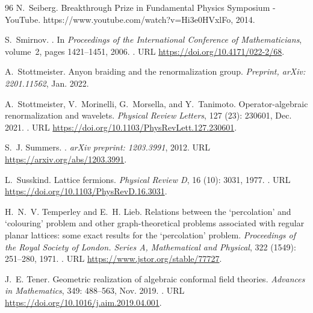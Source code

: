 \documentclass[a4paper, 11pt]{article}
\DeclareMathOperator{\1}{\mathds{1}}
\begin{document}
\begin{thebibliography}{96}
N.~Seiberg.
 {{Breakthrough Prize}} in {{Fundamental Physics Symposium}} -
  {{YouTube}}.
\newblock https://www.youtube.com/watch?v=Hi3e0HVxlFo, 2014.

S.~Smirnov.
.
\newblock In \emph{Proceedings of the International Conference of
  Mathematicians}, volume~2, pages 1421--1451, 2006.
\newblock {}.
\newblock URL \url{https://doi.org/10.4171/022-2/68}.

A.~Stottmeister.
\newblock Anyon braiding and the renormalization group.
\newblock \emph{Preprint, arXiv: 2201.11562}, Jan. 2022.

A.~Stottmeister, V.~Morinelli, G.~Morsella, and Y.~Tanimoto.
\newblock Operator-algebraic renormalization and wavelets.
\newblock \emph{Physical Review Letters}, 127 (23): 230601,
  Dec. 2021.
\newblock {}.
\newblock URL \url{https://doi.org/10.1103/PhysRevLett.127.230601}.

S.~J. Summers.
.
\newblock \emph{arXiv preprint: 1203.3991}, 2012.
\newblock URL \url{https://arxiv.org/abs/1203.3991}.

L.~Susskind.
\newblock Lattice fermions.
\newblock \emph{Physical Review D}, 16 (10): 3031, 1977.
\newblock {}.
\newblock URL \url{https://doi.org/10.1103/PhysRevD.16.3031}.

H.~N.~V. Temperley and E.~H. Lieb.
\newblock Relations between the ‘percolation’ and ‘colouring’ problem
  and other graph-theoretical problems associated with regular planar lattices:
  some exact results for the ‘percolation’ problem.
\newblock \emph{Proceedings of the Royal Society of London. Series A,
  Mathematical and Physical}, 322 (1549): 251--280, 1971.
\newblock {}.
\newblock URL \url{https://www.jstor.org/stable/77727}.

J.~E. Tener.
\newblock Geometric realization of algebraic conformal field theories.
\newblock \emph{Advances in Mathematics}, 349: 488--563, Nov. 2019.
\newblock {}.
\newblock URL \url{https://doi.org/10.1016/j.aim.2019.04.001}.


\end{thebibliography}
\end{document}
